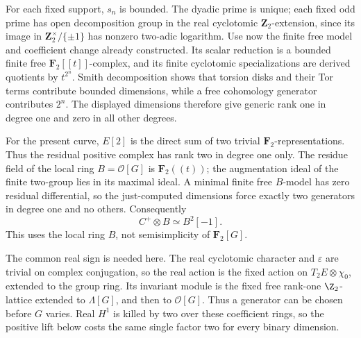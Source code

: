 For each fixed support, $s_n$ is bounded. The dyadic prime is unique;
each fixed odd prime has open decomposition group in the real
cyclotomic $\mathbf Z_2$-extension, since its image in
$\mathbf Z_2^\times/\{\pm1\}$ has nonzero two-adic logarithm.
Use now the finite free model and coefficient change already constructed.
Its scalar reduction is a bounded finite free $\mathbf F_2[[t]]$-complex,
and its finite cyclotomic specializations are derived quotients by
$t^{2^n}$. Smith decomposition shows that torsion disks and their Tor
terms contribute bounded dimensions, while a free cohomology generator
contributes $2^n$. The displayed dimensions therefore give generic
rank one in degree one and zero in all other degrees.

For the present curve, $E[2]$ is the direct sum of two trivial
$\mathbf F_2$-representations. Thus the residual positive complex has
rank two in degree one only. The residue field of the local ring
$B=\mathscr O[G]$ is $\mathbf F_2((t))$; the augmentation ideal of
the finite two-group lies in its maximal ideal. A minimal finite free
$B$-model has zero residual differential, so the just-computed dimensions
force exactly two generators in degree one and no others. Consequently
\[
                    C^+\otimes B\simeq B^2[-1].\tag{E.3}
\]
This uses the local ring $B$, not semisimplicity of $\mathbf F_2[G]$.

The common real sign is needed here. The real cyclotomic character
and $\varepsilon$ are trivial on complex conjugation, so the real
action is the fixed action on $T_2E\otimes\chi_0$, extended to the
group ring. Its invariant module is the fixed free rank-one
$\Z_2$-lattice extended to $\Lambda[G]$, and then to
$\mathscr O[G]$. Thus a generator can be chosen before $G$ varies.
Real $H^1$ is killed by two over these coefficient rings, so the
positive lift below costs the same single factor two for every
binary dimension.
